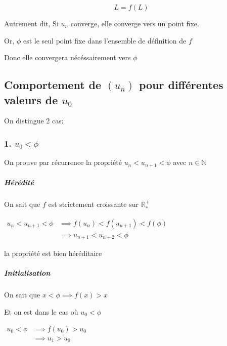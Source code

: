 \documentclass[]{scrartcl}
\let\oldsubparagraph\subparagraph
\renewcommand{\subparagraph}[1]{\oldsubparagraph{#1}\mbox{}}
\begin{document}
\[
L = f(L)
\]

Autrement dit, Si \(u_n\) converge, elle converge vers un point fixe.

Or, \(\phi\) est le seul point fixe dans l'ensemble de définition de
\(f\)

Donc elle convergera nécéssairement vers \(\phi\)

\vspace*{2cm}{}

\hypertarget{comportement-de-u_n-pour-diffuxe9rentes-valeurs-de-u_0}{%
\subsection{\texorpdfstring{Comportement de \((u_n)\) pour différentes
valeurs de
\(u_0\)}{Comportement de (u\_n) pour différentes valeurs de u\_0}}\label{comportement-de-u_n-pour-diffuxe9rentes-valeurs-de-u_0}}

On distingue 2 cas:

\hypertarget{u_0-phi}{%
\subsubsection{\texorpdfstring{1.
\(u_0 < \phi\)}{1. u\_0 \textless{} \textbackslash{}phi}}\label{u_0-phi}}

On prouve par récurrence la propriété \(u_n < u_{n+1} < \phi\) avec
\(n \in \mathbb{N}\)

\hypertarget{huxe9ruxe9dituxe9-2}{%
\subparagraph{Hérédité}\label{huxe9ruxe9dituxe9-2}}

On sait que \(f\) est strictement croissante sur \(\mathbb{R}^+_*\)

\(\begin{array}{cl} u_n < u_{n+1} < \phi &\implies f (u_n) < f(u_{n+1}) < f(\phi)\\ &\implies u_{n+1} < u_{n+2} < \phi \end{array}\)

la propriété est bien héréditaire

\hypertarget{initialisation-2}{%
\subparagraph{Initialisation}\label{initialisation-2}}

On sait que \(x < \phi \implies f(x) > x\)

Et on est dans le cas où \(u_0 < \phi\)

\(\begin{array}{cl} u_0 < \phi &\implies f(u_0) > u_0\\[2ex] &\implies u_1 > u_0 \end{array}\)
\end{document}
